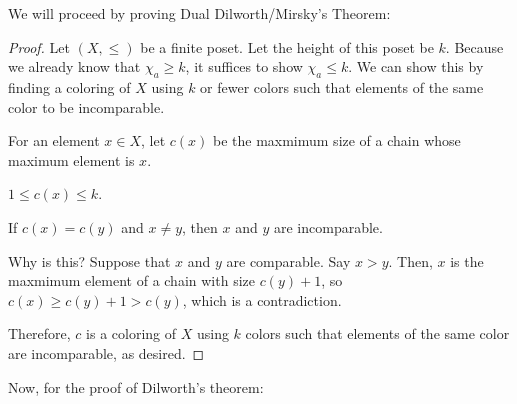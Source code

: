 
We will proceed by proving Dual Dilworth/Mirsky's Theorem:

\begin{proof}
	Let \( (X,\le ) \) be a finite poset. Let the height of this poset be \( k \). Because we already know that \( \chi_a \ge k \), it suffices to show \( \chi_a \le k \). We can show this by finding a coloring of \( X \) using \( k \) or fewer colors such that elements of the same color to be incomparable.

	For an element \( x \in X \), let \( c(x) \) be the maxmimum size of a chain whose maximum element is \( x \). 
	\begin{observe}
		\( 1 \le c(x) \le k \).
	\end{observe}
	\begin{observe}
		If \( c(x) = c(y) \) and \( x\neq y \), then \( x \) and \( y \) are incomparable.
	\end{observe}
	Why is this? Suppose that \( x \) and \( y \) are comparable. Say \( x > y \). Then, \( x \) is the maxmimum element of a chain with size \( c(y)+1 \), so \( c(x) \ge c(y)+1 > c(y) \), which is a contradiction.

	Therefore, \( c \) is a coloring of \( X \) using \( k \) colors such that elements of the same color are incomparable, as desired.
\end{proof}

Now, for the proof of Dilworth's theorem:

